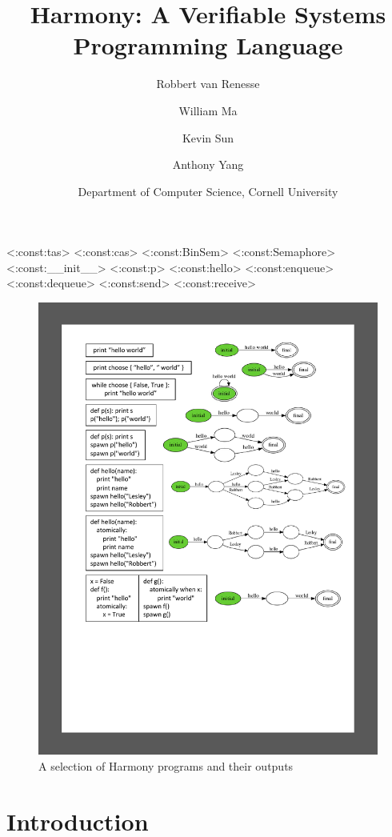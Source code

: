 \documentclass[twocolumn]{article}
\title{Harmony: A Verifiable Systems Programming Language}
\author{Robbert van Renesse \and William Ma \and Kevin Sun \and Anthony Yang}
\date{Department of Computer Science, Cornell University}
\begin{document}
\maketitle

<{:const:tas}>
<{:const:cas}>
<{:const:BinSem}>
<{:const:Semaphore}>
<{:const:__init__}>
<{:const:p}>
<{:const:hello}>
<{:const:enqueue}>
<{:const:dequeue}>
<{:const:send}>
<{:const:receive}>

\begin{figure}
\begin{center}
\includegraphics[width=.9\textwidth]{hello.pdf}
\end{center}
\caption{A selection of Harmony programs and their outputs}
\label{fig:helloworld}
\end{figure}

\section{Introduction}
\end{document}
